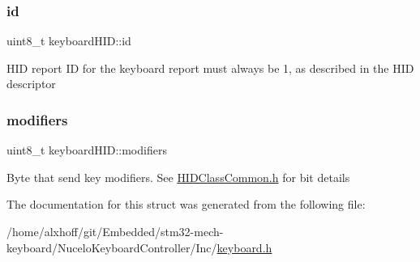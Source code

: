 \subsubsection{\texorpdfstring{id}{id}}
{\footnotesize\ttfamily uint8\+\_\+t keyboard\+H\+I\+D\+::id}

H\+ID report ID for the keyboard report must always be 1, as described in the H\+ID descriptor \mbox{\label{structkeyboardHID_af9b16f0982275eddfa430dd71fa64825}} 
\subsubsection{\texorpdfstring{modifiers}{modifiers}}
{\footnotesize\ttfamily uint8\+\_\+t keyboard\+H\+I\+D\+::modifiers}

Byte that send key modifiers. See \hyperlink{HIDClassCommon_8h}{H\+I\+D\+Class\+Common.\+h} for bit details 

The documentation for this struct was generated from the following file\+:\begin{DoxyCompactItemize}
\item 
/home/alxhoff/git/\+Embedded/stm32-\/mech-\/keyboard/\+Nucelo\+Keyboard\+Controller/\+Inc/\hyperlink{keyboard_8h}{keyboard.\+h}\end{DoxyCompactItemize}
